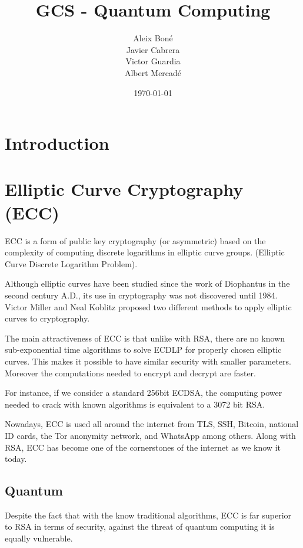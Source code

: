 

\title{
    GCS - Quantum Computing
}
\author {
    Aleix Boné\\
    Javier Cabrera\\
    Victor Guardia\\
    Albert Mercadé
}
\date{
    \today
}





\section{Introduction}%
\label{sec:introduction}

\section{Elliptic Curve Cryptography (ECC)}

ECC is a form of public key cryptography (or asymmetric) based on the complexity
of computing discrete logarithms in elliptic curve groups. (Elliptic Curve
Discrete Logarithm Problem).

Although elliptic curves have been studied since the work of Diophantus in the
second century A.D., its use in cryptography was not discovered until 1984.
Victor Miller and Neal Koblitz proposed two different methods to apply elliptic
curves to cryptography.

The main attractiveness of ECC is that unlike with RSA, there are no known
sub-exponential time algorithms to solve ECDLP for properly chosen elliptic
curves. This makes it possible to have similar security with smaller parameters.
Moreover the computations needed to encrypt and decrypt are faster.

For instance, if we consider a standard 256bit ECDSA, the computing power needed
to crack with known algorithms is equivalent to a 3072 bit RSA.

Nowadays, ECC is used all around the internet from TLS, SSH, Bitcoin, national
ID cards, the Tor anonymity network, and WhatsApp among others. Along with RSA,
ECC has become one of the cornerstones of the internet as we know it today.

\subsection{Quantum}

Despite the fact that with the know traditional algorithms, ECC is far superior
to RSA in terms of security, against the threat of quantum computing it is
equally vulnerable.

